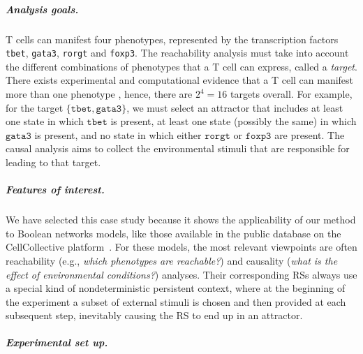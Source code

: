 \subparagraph*{Analysis goals.}
T cells can manifest four phenotypes, 
represented by the transcription factors \texttt{tbet}, \texttt{gata3}, \texttt{rorgt} and \texttt{foxp3}.
The reachability analysis must take into account the different combinations of phenotypes that a T cell can express, called a \emph{target}.
There exists experimental and computational evidence that a T cell can manifest more than one phenotype \cite{luckheeram2012cd4+,puniya2018mechanistic}, hence, there are $2^4=16$ targets overall.
For example, for the target $\{\texttt{tbet},\texttt{gata3}\}$, we must select an attractor that includes at least one state in which $\texttt{tbet}$ is present, at least one state (possibly the same) in which $\texttt{gata3}$ is present, and no state in which either $\texttt{rorgt}$ or $\texttt{foxp3}$ are present. 
The causal analysis aims to collect the environmental stimuli that are responsible for leading to that target.

\subparagraph*{Features of interest.}
We have selected this case study because it shows the applicability of our method to Boolean networks models, like those available in the public database on the CellCollective platform~\cite{helikar2012cell}. 
For these models, the most relevant viewpoints are often reachability (e.g., \emph{which phenotypes are reachable?}) and causality (\emph{what is the effect of environmental conditions?}) analyses.
Their corresponding RSs always use a special kind of nondeterministic persistent context, where at the beginning of the experiment a subset of external stimuli is chosen and then provided at each subsequent step, inevitably causing the RS to end up in an attractor.

\subparagraph*{Experimental set up.}

